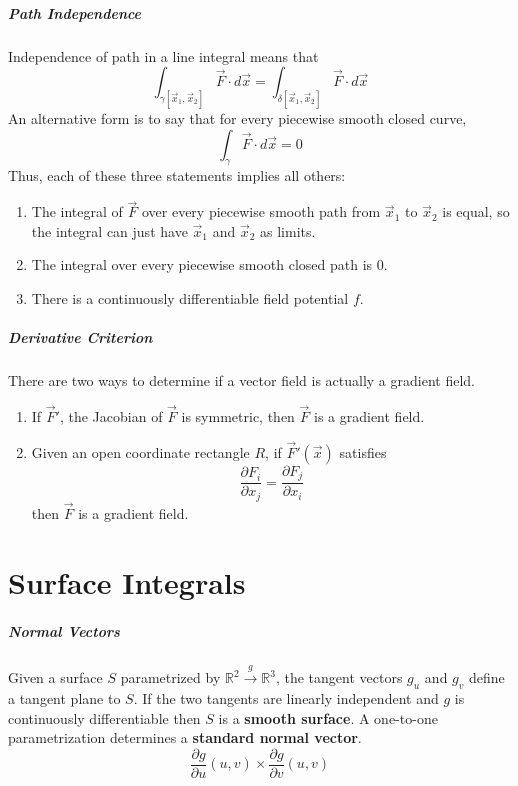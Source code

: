 \documentclass[11pt]{article}
\begin{document}
	\subparagraph{Path Independence} Independence of path in a line integral means that
		\begin{equation}
			\int_{\gamma[\vec{x}_1, \vec{x}_2]} \vec{F} \cdot d\vec{x} = \int_{\delta[\vec{x}_1, \vec{x}_2]} \vec{F} \cdot d\vec{x}
		\end{equation}
		An alternative form is to say that for every piecewise smooth closed curve,
		\begin{equation}
			\int_\gamma \vec{F} \cdot d\vec{x} = 0
		\end{equation}
		Thus, each of these three statements implies all others:
		\begin{enumerate}
			\item The integral of $\vec{F}$ over every piecewise smooth path from $\vec{x}_1$ to $\vec{x}_2$ is equal, so the integral can just have $\vec{x}_1$ and $\vec{x}_2$ as limits.
			\item The integral over every piecewise smooth closed path is 0.
			\item There is a continuously differentiable field potential $f$.
		\end{enumerate}
		
	\subparagraph{Derivative Criterion} There are two ways to determine if a vector field is actually a gradient field.
		\begin{enumerate}
			\item If $\vec{F}'$, the Jacobian of $\vec{F}$ is symmetric, then $\vec{F}$ is a gradient field.
			\item Given an open coordinate rectangle $R$, if $\vec{F}'(\vec{x})$ satisfies
				\[\frac{\partial F_i}{\partial x_j} = \frac{\partial F_j}{\partial x_i}\]
				then $\vec{F}$ is a gradient field.
		\end{enumerate}
		
\section{Surface Integrals}
	\subparagraph{Normal Vectors} Given a surface $S$ parametrized by $\mathbb{R}^2 \xrightarrow{g} \mathbb{R}^3$, the tangent vectors $g_u$ and $g_v$ define a tangent plane to $S$. If the two tangents are linearly independent and $g$ is continuously differentiable then $S$ is a \textbf{smooth surface}. A one-to-one parametrization determines a \textbf{standard normal vector}.
		\begin{equation}
			\frac{\partial g}{\partial u}(u, v) \times \frac{\partial g}{\partial v}(u, v)
		\end{equation}
		
\end{document}
